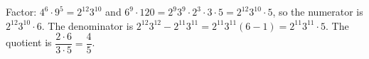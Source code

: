 Factor: $4^6\cdot9^5=2^{12}3^{10}$ and $6^9\cdot120=2^9 3^9\cdot2^3\cdot3\cdot5=2^{12}3^{10}\cdot5$, so the numerator is $2^{12}3^{10}\cdot6$. The denominator is $2^{12}3^{12}-2^{11}3^{11}=2^{11}3^{11}(6-1)=2^{11}3^{11}\cdot5$. The quotient is $\dfrac{2\cdot6}{3\cdot5}=\boxed{\dfrac45}$.
